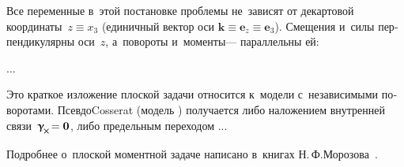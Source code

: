 \label{section:planedeformation.cosseratcontinuum}

\begin{otherlanguage}{russian}

Все переменные в~этой постановке проблемы не~зависят от декартовой координаты~${z \equiv x_3}$
(единичный вектор оси ${\bm{k} \equiv \bm{e}_z \equiv \bm{e}_3}$).
Смещения и~силы перпендикулярны оси~$z$, а~повороты и~моменты\:--- параллельны ей:

...


Это краткое изложение плоской задачи относится к~модели с~независимыми поворотами.
Псевдо\rucontinuum Cosserat (модель ) получается
либо наложением внутренней связи~${\distortiontensor_{\hspace{-0.25ex}\Xcompanion} \hspace{-0.32ex} = \zerovector}$,
либо предельным переходом ...

Подробнее о~плоской моментной задаче написано в~книгах Н.\,Ф.\;Морозова~\cite{morozov-twodimensionalproblems, morozov-fractures}.

\end{otherlanguage}



\label{section:nonlinear.micropolar}

